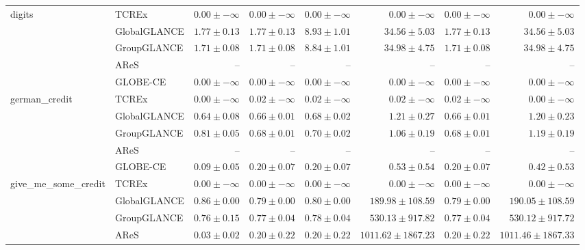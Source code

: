 \begin{table}[ht]
\begin{center}
\begin{sc}
\begin{scriptsize}
\begin{tabular}{l|l|rrrrrr}
\midrule
\multirow{5}{*}{digits} & TCREx & $\boldsymbol{0.00\pm{-\infty}}$ & $\boldsymbol{0.00\pm{-\infty}}$ & $\boldsymbol{0.00\pm{-\infty}}$ & $\boldsymbol{0.00\pm{-\infty}}$ & $\boldsymbol{0.00\pm{-\infty}}$ & $\boldsymbol{0.00\pm{-\infty}}$ \\
 & GlobalGLANCE & $1.77\pm{0.13}$ & $1.77\pm{0.13}$ & $8.93\pm{1.01}$ & $34.56\pm{5.03}$ & $1.77\pm{0.13}$ & $34.56\pm{5.03}$ \\
 & GroupGLANCE & $1.71\pm{0.08}$ & $1.71\pm{0.08}$ & $8.84\pm{1.01}$ & $34.98\pm{4.75}$ & $1.71\pm{0.08}$ & $34.98\pm{4.75}$ \\
 & AReS & -- & -- & -- & -- & -- & -- \\
 & GLOBE-CE & $\boldsymbol{0.00\pm{-\infty}}$ & $\boldsymbol{0.00\pm{-\infty}}$ & $\boldsymbol{0.00\pm{-\infty}}$ & $\boldsymbol{0.00\pm{-\infty}}$ & $\boldsymbol{0.00\pm{-\infty}}$ & $\boldsymbol{0.00\pm{-\infty}}$ \\
\midrule
\multirow{5}{*}{german\_credit} & TCREx & $\boldsymbol{0.00\pm{-\infty}}$ & $\boldsymbol{0.02\pm{-\infty}}$ & $\boldsymbol{0.02\pm{-\infty}}$ & $\boldsymbol{0.02\pm{-\infty}}$ & $\boldsymbol{0.02\pm{-\infty}}$ & $\boldsymbol{0.00\pm{-\infty}}$ \\
 & GlobalGLANCE & $0.64\pm{0.08}$ & $0.66\pm{0.01}$ & $0.68\pm{0.02}$ & $1.21\pm{0.27}$ & $0.66\pm{0.01}$ & $1.20\pm{0.23}$ \\
 & GroupGLANCE & $0.81\pm{0.05}$ & $0.68\pm{0.01}$ & $0.70\pm{0.02}$ & $1.06\pm{0.19}$ & $0.68\pm{0.01}$ & $1.19\pm{0.19}$ \\
 & AReS & -- & -- & -- & -- & -- & -- \\
 & GLOBE-CE & $0.09\pm{0.05}$ & $0.20\pm{0.07}$ & $0.20\pm{0.07}$ & $0.53\pm{0.54}$ & $0.20\pm{0.07}$ & $0.42\pm{0.53}$ \\
\midrule
\multirow{5}{*}{give\_me\_some\_credit} & TCREx & $\boldsymbol{0.00\pm{-\infty}}$ & $\boldsymbol{0.00\pm{-\infty}}$ & $\boldsymbol{0.00\pm{-\infty}}$ & $\boldsymbol{0.00\pm{-\infty}}$ & $\boldsymbol{0.00\pm{-\infty}}$ & $\boldsymbol{0.00\pm{-\infty}}$ \\
 & GlobalGLANCE & $0.86\pm{0.00}$ & $0.79\pm{0.00}$ & $0.80\pm{0.00}$ & $189.98\pm{108.59}$ & $0.79\pm{0.00}$ & $190.05\pm{108.59}$ \\
 & GroupGLANCE & $0.76\pm{0.15}$ & $0.77\pm{0.04}$ & $0.78\pm{0.04}$ & $530.13\pm{917.82}$ & $0.77\pm{0.04}$ & $530.12\pm{917.72}$ \\
 & AReS & $0.03\pm{0.02}$ & $0.20\pm{0.22}$ & $0.20\pm{0.22}$ & $1011.62\pm{1867.23}$ & $0.20\pm{0.22}$ & $1011.46\pm{1867.33}$ \\

\end{tabular}
\end{scriptsize}
\end{sc}
\end{center}
\end{table}
